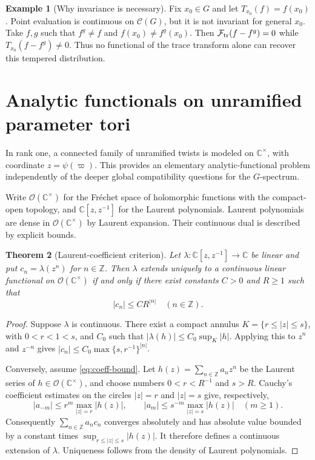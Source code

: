 \documentclass[12pt,letterpaper]{amsart}
\numberwithin{equation}{section}
\newtheorem{theorem}{Theorem}[section]
\theoremstyle{definition}
\newtheorem{example}[theorem]{Example}
\theoremstyle{remark}
\newcommand{\calC}{\mathcal C}
\begin{document}
\begin{example}[Why invariance is necessary]
Fix $x_0\in G$ and let $T_{x_0}(f)=f(x_0)$. Point evaluation is continuous on $\calC(G)$, but it is not invariant for general $x_0$. Take $f,g$ such that $f^g\ne f$ and $f(x_0)\ne f^g(x_0)$. Then $\mathcal F_{\rm tr}(f-f^g)=0$ while $T_{x_0}(f-f^g)\ne0$. Thus no functional of the trace transform alone can recover this tempered distribution.
\end{example}

\section{Analytic functionals on unramified parameter tori}\label{sec:analytic}
In rank one, a connected family of unramified twists is modeled on $\mathbb C^\times$, with coordinate $z=\psi(\varpi)$. This provides an elementary analytic-functional problem independently of the deeper global compatibility questions for the $G$-spectrum.

Write $\mathcal O(\mathbb C^\times)$ for the Fr\'echet space of holomorphic functions with the compact-open topology, and $\mathbb C[z,z^{-1}]$ for the Laurent polynomials. Laurent polynomials are dense in $\mathcal O(\mathbb C^\times)$ by Laurent expansion. Their continuous dual is described by explicit bounds.

\begin{theorem}[Laurent-coefficient criterion]\label{thm:laurent}
Let $\lambda:\mathbb C[z,z^{-1}]\to\mathbb C$ be linear and put $c_n=\lambda(z^n)$ for $n\in\mathbb Z$. Then $\lambda$ extends uniquely to a continuous linear functional on $\mathcal O(\mathbb C^\times)$ if and only if there exist constants $C>0$ and $R\ge1$ such that
\begin{equation}\label{eq:coeff-bound}
|c_n|\le C R^{|n|}\quad(n\in\mathbb Z).
\end{equation}
\end{theorem}
\begin{proof}
Suppose $\lambda$ is continuous. There exist a compact annulus $K=\{r\le|z|\le s\}$, with $0<r<1<s$, and $C_0$ such that $|\lambda(h)|\le C_0\sup_K|h|$. Applying this to $z^n$ and $z^{-n}$ gives $|c_n|\le C_0\max\{s,r^{-1}\}^{|n|}$.

Conversely, assume \eqref{eq:coeff-bound}. Let $h(z)=\sum_{n\in\mathbb Z}a_nz^n$ be the Laurent series of $h\in\mathcal O(\mathbb C^\times)$, and choose numbers $0<r<R^{-1}$ and $s>R$.  Cauchy's coefficient estimates on the circles $|z|=r$ and $|z|=s$ give, respectively,
\[
|a_{-m}|\le r^m\max_{|z|=r}|h(z)|,\qquad
|a_m|\le s^{-m}\max_{|z|=s}|h(z)|\quad(m\ge1).
\]
Consequently $\sum_{n\in\mathbb Z}a_nc_n$ converges absolutely and has absolute value bounded by a constant times $\sup_{r\le|z|\le s}|h(z)|$.  It therefore defines a continuous extension of $\lambda$. Uniqueness follows from the density of Laurent polynomials.
\end{proof}
\end{document}
